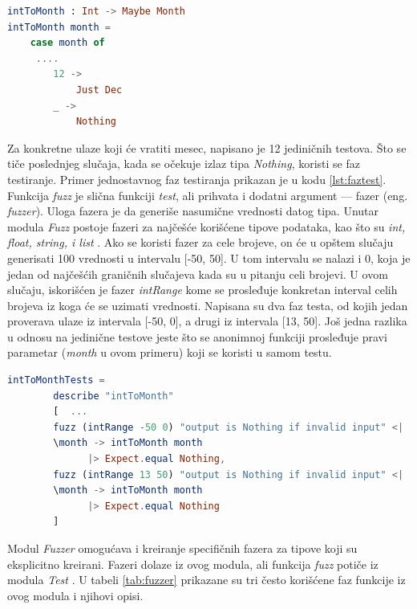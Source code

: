 \documentclass[12pt,oneside]{memoir}
\begin{document}
\begin{lstlisting}[language=elm, caption={Implementacija funkcije \emph{intToMonth}},captionpos=b, label={lst:primerfaz}]
intToMonth : Int -> Maybe Month
intToMonth month =
    case month of
     .... 
        12 ->
            Just Dec
        _ ->
            Nothing
\end{lstlisting}

\par Za konkretne ulaze koji će vratiti mesec, napisano je 12 jediničnih testova. Što se tiče poslednjeg slučaja, kada se očekuje izlaz tipa \emph{Nothing}, koristi se faz testiranje. Primer jednostavnog faz testiranja prikazan je u kodu \ref{lst:faztest}. Funkcija \emph{fuzz} je slična funkciji \emph{test}, ali prihvata i dodatni argument --- fazer (eng. \emph{fuzzer}). Uloga fazera je da generiše nasumične vrednosti datog tipa. Unutar modula \emph{Fuzz} postoje fazeri za najčešće korišćene tipove podataka, kao što su \emph{int, float, string, i list} \cite{fuzz}. Ako se koristi fazer za cele brojeve, on će u opštem slučaju generisati 100 vrednosti u intervalu [-50, 50]. U tom intervalu se nalazi i 0, koja je jedan od najčešćih graničnih slučajeva kada su u pitanju celi brojevi. U ovom slučaju, iskorišćen je fazer \emph{intRange} kome se prosleđuje konkretan interval celih brojeva iz koga će se uzimati vrednosti. Napisana su dva faz testa, od kojih jedan proverava ulaze iz intervala [-50, 0], a drugi iz intervala [13, 50]. Još jedna razlika u odnosu na jedinične testove jeste što se anonimnoj funkciji prosleđuje pravi parametar (\emph{month} u ovom primeru) koji se koristi u samom testu. 

\begin{lstlisting}[language=elm, caption={Implementacija faz testova za funkciju \emph{intToMonth}},captionpos=b, label={lst:faztest}]
intToMonthTests =
        describe "intToMonth"
        [  ...
        fuzz (intRange -50 0) "output is Nothing if invalid input" <|
        \month -> intToMonth month
              |> Expect.equal Nothing, 
        fuzz (intRange 13 50) "output is Nothing if invalid input" <|
        \month -> intToMonth month
              |> Expect.equal Nothing
        ]
\end{lstlisting}

\par Modul \emph{Fuzzer} omogućava i kreiranje specifičnih fazera za tipove koji su eksplicitno kreirani. Fazeri dolaze iz ovog modula, ali funkcija \emph{fuzz} potiče iz modula \emph{Test} \cite{testmodul}. U tabeli \ref{tab:fuzzer} prikazane su tri često korišćene faz funkcije iz ovog modula i njihovi opisi.
\end{document}
